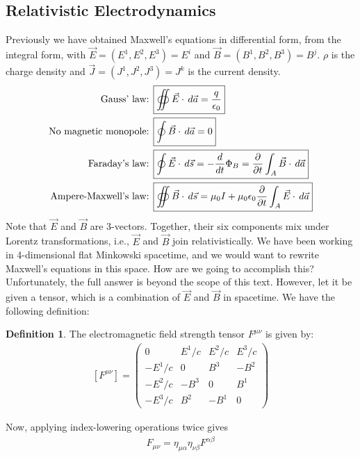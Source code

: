 \documentclass{article}
\theoremstyle{definition}
\newtheorem{defn}{Definition}[section]
\begin{document}
\subsection{Relativistic Electrodynamics}
Previously we have obtained Maxwell's equations in differential form, from the integral form, with $\vec{E} = \left( E^1, E^2, E^3 \right) = E^i $ and $\vec{B} = \left( B^1, B^2, B^3 \right) = B^j $. $\rho$ is the charge density and $\vec{J} = \left( J^1, J^2, J^3 \right)=J^k$ is the current density.
\begin{align*}
\text{Gauss' law:  } \Aboxed{&\oiint\vec{E}\cdot\,d\vec{a} = \frac{q}{\epsilon_0}}\\
\text{No magnetic monopole:  } \Aboxed{&\oint\vec{B}\cdot\,d\vec{a} = 0}\\
\text{Faraday's law:  } 
\Aboxed{&\oint \vec{E}\cdot\,d\vec{s} = -\frac{d}{dt}\Phi_B = \frac{\partial}{\partial t}\int_A\vec{B}\cdot\,d\vec{a}}\\  
\text{Ampere-Maxwell's law:  } 
\Aboxed{&\oiint \vec{B}\cdot\,d\vec{s} = \mu_0I + \mu_0\epsilon_0\frac{\partial}{\partial t}\int_A\vec{E}\cdot\,d\vec{a}}
\end{align*}
Note that $\vec{E}$ and $\vec{B}$ are 3-vectors. Together, their six components mix under Lorentz transformations, i.e., $\vec{E}$ and $\vec{B}$ join relativistically. We have been working in 4-dimensional flat Minkowski spacetime, and we would want to rewrite Maxwell's equations in this space. How are we going to accomplish this? Unfortunately, the full answer is beyond the scope of this text. However, let it be given a tensor, which is a combination of $\vec{E}$ and $\vec{B}$ in spacetime. We have the following definition:
\begin{defn}
	The electromagnetic field strength tensor $F^{\mu\nu}$ is given by:
	\begin{align*}
	\boxed{[F^{\mu\nu}] = 
	\begin{pmatrix}
	0 & E^1/c & E^2/c & E^3/c\\
	-E^1/c & 0 & B^3 & -B^2\\
	-E^2/c & -B^3 & 0 & B^1\\
	-E^3/c & B^2 & -B^1 & 0
	\end{pmatrix}}
	\end{align*}
\end{defn}
Now, applying index-lowering operations twice gives
\begin{align*}
\boxed{F_{\mu\nu} = \eta_{\mu\alpha}\eta_{\nu\beta}F^{\alpha\beta}}
\end{align*}
\end{document}
